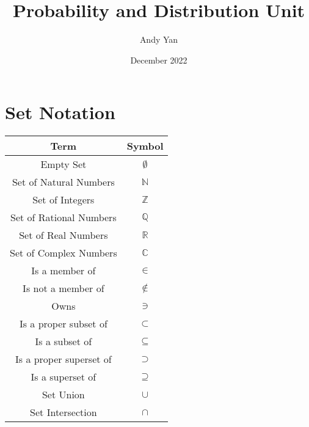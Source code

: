 \documentclass{article}
\title{Probability and Distribution Unit}
\author{Andy Yan}
\date{December 2022}
\begin{document}
\maketitle


\section{Set Notation}
\begin{center}
\def\arraystretch{1}
{\setlength{\tabcolsep}{3em}
\begin{tabular}{| c | c |} 
 \hline
   \textbf{Term} & \textbf{Symbol}\\ 
 \hline
Empty Set    & \(\emptyset\) \\
 \hline
Set of Natural Numbers	& \(\mathbb{N}\) \\
 \hline
Set of Integers	& \(\mathbb{Z}\) \\
 \hline
Set of Rational Numbers	& \(\mathbb{Q}\) \\
 \hline
Set of Real Numbers	& \(\mathbb{R}\) \\
 \hline
Set of Complex Numbers	& \(\mathbb{C}\) \\
 \hline
Is a member of	& \(\in\) \\
 \hline
Is not a member of	& \(\notin\) \\
 \hline
Owns	& \(\ni\) \\
 \hline
Is a proper subset of	& \(\subset\) \\
  \hline
Is a subset of	& \(\subseteq\) \\
  \hline
Is a proper superset of	& \(\supset\) \\
  \hline
Is a superset of	& \(\supseteq\) \\
  \hline
Set Union & \(\cup\) \\
    \hline
Set Intersection & \(\cap\) \\
    \hline
\end{tabular}}
\end{center}
\end{document}
